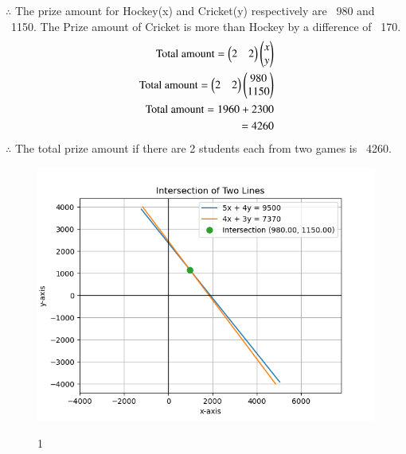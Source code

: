 \documentclass[journal]{IEEEtran}
\begin{document}
$\therefore$ The prize amount for Hockey(x) and Cricket(y) respectively are \rupee~980 and \rupee~1150.
The Prize amount of Cricket is more than Hockey by a difference of \rupee~170.
\begin{align}
    \text{Total amount}= \begin{pmatrix}2&2\end{pmatrix}\begin{pmatrix}x\\y\end{pmatrix}\\
    \text{Total amount}= \begin{pmatrix}2&2\end{pmatrix}\begin{pmatrix}980\\1150\end{pmatrix}\\
    \text{Total amount}=1960+2300 \notag\\
    =4260
\end{align}
$\therefore$ The total prize amount if there are 2 students each from two games is \rupee~4260.
    \begin{figure}[H]
    \centering
    \includegraphics[width=0.7\columnwidth]{figs/Figure_1.png}
    \label{fig:placeholder}
    \caption{1}
\end{figure}
\end{document}
